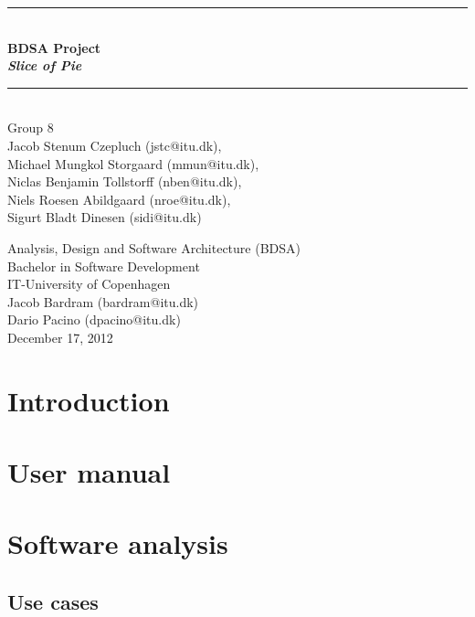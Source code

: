 \documentclass[a4paper,11pt]{article}
\begin{document}
\begin{titlepage}
\centering \parindent=0pt
\newcommand{\HRule}{\rule{\textwidth}{1mm}}
 \HRule\\[1cm]\Huge\bfseries
BDSA Project\\\emph{Slice of Pie}\\[0.7cm]
\HRule\\[4cm]  \large Group 8
\\Jacob Stenum Czepluch (jstc@itu.dk), 
\\Michael Mungkol Storgaard (mmun@itu.dk),
\\Niclas Benjamin Tollstorff (nben@itu.dk), 
\\Niels Roesen Abildgaard (nroe@itu.dk), 
\\Sigurt Bladt Dinesen (sidi@itu.dk) \\

 \normalsize %
\thispagestyle{empty}
\begin{flushleft}
Analysis, Design and Software Architecture (BDSA)\\
Bachelor in Software Development\\
IT-University of Copenhagen\\
Jacob Bardram (bardram@itu.dk)\\
Dario Pacino (dpacino@itu.dk) \\
December 17, 2012 \end{flushleft}
\end{titlepage}

\tableofcontents
\pagebreak

\pagebreak
\setcounter{page}{4}
\section{Introduction}


\pagebreak
\section{User manual}

\pagebreak
\section{Software analysis}


\subsection{Use cases}

\end{document}
